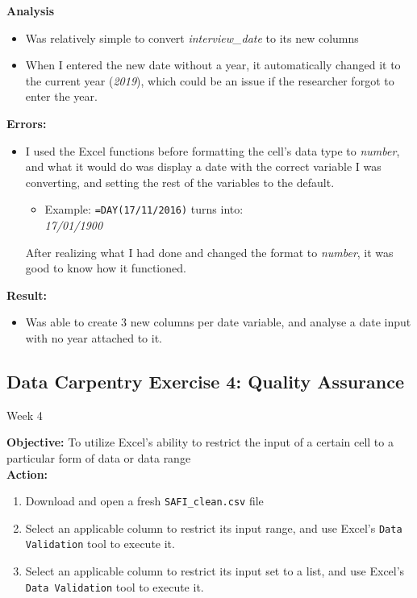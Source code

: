 \documentclass{article}
\begin{document}
\textbf{Analysis}
\begin{itemize}
    \item Was relatively simple to convert \textit{interview\_date} to its new columns
    \item When I entered the new date without a year, it automatically changed it to the current year (\textit{2019}), which could be an issue if the researcher forgot to enter the year.
\end{itemize}
\textbf{Errors:}
\begin{itemize}
    \item I used the Excel functions before formatting the cell's data type to \textit{number}, and what it would do was display a date with the correct variable I was converting, and setting the rest of the variables to the default.
    \begin{itemize}
        \item Example: \verb|=DAY(17/11/2016)| turns into:\\ \textit{17/01/1900}
    \end{itemize}
    After realizing what I had done and changed the format to \textit{number}, it was good to know how it functioned.
\end{itemize}
\textbf{Result:}
\begin{itemize}
    \item Was able to create 3 new columns per date variable, and analyse a date input with no year attached to it.
\end{itemize}
\newpage
\begin{center}
\section{Data Carpentry Exercise 4: Quality Assurance}
Week 4
\end{center}
\textbf{Objective:} To utilize Excel's ability to restrict the input of a certain cell to a particular form of data or data range \\
\textbf{Action:}
\begin{enumerate}
    \item Download and open a fresh \verb|SAFI_clean.csv| file
    \item Select an applicable column to restrict its input range, and use Excel's \verb|Data Validation| tool to execute it.
    \item Select an applicable column to restrict its input set to a list, and use Excel's \verb|Data Validation| tool to execute it.
\end{enumerate}
\end{document}
